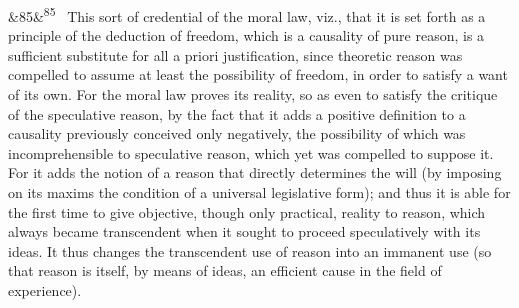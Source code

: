 \documentclass[12pt]{article}
\newcommand{\para}[1][]{\par\noindent\ifx&#1&\else\textsuperscript{\footnotesize #1}~\fi}
\begin{document}
\para[85] This sort of credential of the moral law, viz., that it is set forth as a principle of the deduction of freedom, which is a causality of pure reason, is a sufficient substitute for all a priori justification, since theoretic reason was compelled to assume at least the possibility of freedom, in order to satisfy a want of its own. For the moral law proves its reality, so as even to satisfy the critique of the speculative reason, by the fact that it adds a positive definition to a causality previously conceived only negatively, the possibility of which was incomprehensible to speculative reason, which yet was compelled to suppose it. For it adds the notion of a reason that directly determines the will (by imposing on its maxims the condition of a universal legislative form); and thus it is able for the first time to give objective, though only practical, reality to reason, which always became transcendent when it sought to proceed speculatively with its ideas. It thus changes the transcendent use of reason into an immanent use (so that reason is itself, by means of ideas, an efficient cause in the field of experience).
\end{document}
